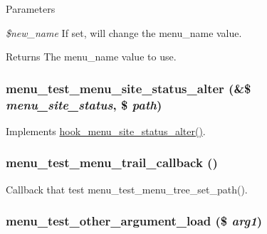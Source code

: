 \begin{DoxyParams}{Parameters}
\item[{\em \$new\_\-name}]If set, will change the menu\_\-name value. \end{DoxyParams}
\begin{DoxyReturn}{Returns}
The menu\_\-name value to use. 
\end{DoxyReturn}
\hypertarget{menu__test_8module_af13558b9100667f8f343fe0c2b87217b}{
\subsubsection[{menu\_\-test\_\-menu\_\-site\_\-status\_\-alter}]{\setlength{\rightskip}{0pt plus 5cm}menu\_\-test\_\-menu\_\-site\_\-status\_\-alter (\&\$ {\em menu\_\-site\_\-status}, \/  \$ {\em path})}}
\label{menu__test_8module_af13558b9100667f8f343fe0c2b87217b}
Implements \hyperlink{group__hooks_ga3096be11aad61c8b342ade94789f6137}{hook\_\-menu\_\-site\_\-status\_\-alter()}. \hypertarget{menu__test_8module_a264e083b1cc00f2a5d2bfaf4395df8d5}{
\subsubsection[{menu\_\-test\_\-menu\_\-trail\_\-callback}]{\setlength{\rightskip}{0pt plus 5cm}menu\_\-test\_\-menu\_\-trail\_\-callback ()}}
\label{menu__test_8module_a264e083b1cc00f2a5d2bfaf4395df8d5}
Callback that test menu\_\-test\_\-menu\_\-tree\_\-set\_\-path(). \hypertarget{menu__test_8module_ae8d4a2e171ba77f8de35bd7570855741}{
\subsubsection[{menu\_\-test\_\-other\_\-argument\_\-load}]{\setlength{\rightskip}{0pt plus 5cm}menu\_\-test\_\-other\_\-argument\_\-load (\$ {\em arg1})}}
